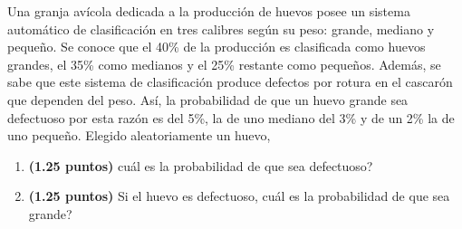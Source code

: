 
Una granja avícola dedicada a la producción de huevos posee un sistema automático de clasificación en tres calibres según su peso: grande, mediano y pequeño. Se conoce que el 40\% de la producción es clasificada como huevos grandes, el 35\% como medianos y el 25\% restante como pequeños. Además, se sabe que este sistema de clasificación produce defectos por rotura en el cascarón que dependen del peso. Así, la probabilidad de que un huevo grande sea defectuoso por esta razón es del 5\%, la de uno mediano del 3\% y de un 2\% la de uno pequeño. Elegido aleatoriamente un huevo,
\begin{enumerate}[label=\alph*)]
\item \textbf{(1.25 puntos)} \textquestiondown{}cuál es la probabilidad de que sea defectuoso?
\item \textbf{(1.25 puntos)} Si el huevo es defectuoso, \textquestiondown{}cuál es la probabilidad de que sea grande?
\end{enumerate}
